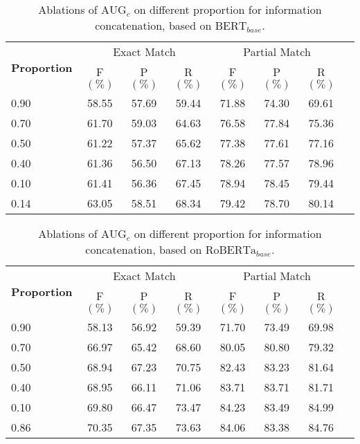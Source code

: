 \begin{table*}[H] 
	\caption{Ablations of $\text{AUG}_{c}$ on different proportion for information concatenation, based on $\text{BERT}_{base}$.} 
	\label{tab:different_ratio_bert}
	\begin{tabular*}{\textwidth}{@{\extracolsep{\fill}}lccccccc}
		\toprule
		\multirow{2}{*}{\textbf{Proportion}} & \multicolumn{3}{c}{Exact Match} & \multicolumn{3}{c}{Partial Match}  \\
		\cline{2-7} 
		\addlinespace
		& F\((\%)\) & P\((\%)\) & R\((\%)\) & F\((\%)\) & P\((\%)\) & R\((\%)\) \\
		\midrule
		0.90 & 58.55 & 57.69 & 59.44 & 71.88 & 74.30 & 69.61 \\ 
		0.70 & 61.70 & 59.03 & 64.63 & 76.58 & 77.84 & 75.36 \\
		0.50 & 61.22 & 57.37 & 65.62 & 77.38 & 77.61 & 77.16 \\
		0.40 & 61.36 & 56.50 & 67.13 & 78.26 & 77.57 & 78.96 \\
		0.10 & 61.41 & 56.36 & 67.45 & 78.94 & 78.45 & 79.44 \\
		0.14 & 63.05 & 58.51 & 68.34 & 79.42 & 78.70 & 80.14 \\
		\bottomrule
	\end{tabular*}      
\end{table*}



\begin{table*}[H] 
	\caption{Ablations of $\text{AUG}_{c}$ on different proportion for information concatenation, based on $\text{RoBERTa}_{base}$.} 
	\label{tab:different_ratio_roberta}
	\begin{tabular*}{\textwidth}{@{\extracolsep{\fill}}lccccccc}
		\toprule
		\multirow{2}{*}{\textbf{Proportion}} & \multicolumn{3}{c}{Exact Match} & \multicolumn{3}{c}{Partial Match}  \\
		\cline{2-7} 
		\addlinespace
		& F\((\%)\) & P\((\%)\) & R\((\%)\) & F\((\%)\) & P\((\%)\) & R\((\%)\) \\
		\midrule
		0.90 & 58.13 & 56.92 & 59.39 & 71.70 & 73.49 & 69.98 \\ 
		0.70 & 66.97 & 65.42 & 68.60 & 80.05 & 80.80 & 79.32 \\
		0.50 & 68.94 & 67.23 & 70.75 & 82.43 & 83.23 & 81.64 \\
		0.40 & 68.95 & 66.11 & 71.06 & 83.71 & 83.71 & 81.71 \\
		0.10 & 69.80 & 66.47 & 73.47 & 84.23 & 83.49 & 84.99 \\
		0.86 & 70.35 & 67.35 & 73.63 & 84.06 & 83.38 & 84.76 \\
		\bottomrule
	\end{tabular*}      
\end{table*}



